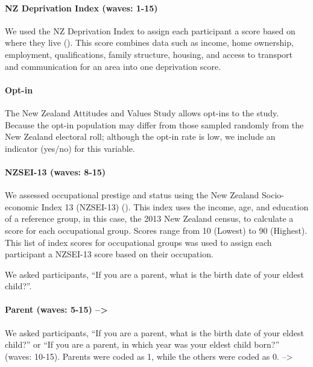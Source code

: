 \documentclass[
  singlecolumn]{article}
\let\oldparagraph\paragraph
\renewcommand{\paragraph}[1]{\oldparagraph{#1}\mbox{}}
\begin{document}
\paragraph{NZ Deprivation Index (waves:
1-15)}\label{nz-deprivation-index-waves-1-15}

We used the NZ Deprivation Index to assign each participant a score
based on where they live (). This score combines data such as income, home ownership,
employment, qualifications, family structure, housing, and access to
transport and communication for an area into one deprivation score.

\paragraph{Opt-in}\label{opt-in}

The New Zealand Attitudes and Values Study allows opt-ins to the study.
Because the opt-in population may differ from those sampled randomly
from the New Zealand electoral roll; although the opt-in rate is low, we
include an indicator (yes/no) for this variable.

\paragraph{NZSEI-13 (waves: 8-15)}\label{nzsei-13-waves-8-15}

We assessed occupational prestige and status using the New Zealand
Socio-economic Index 13 (NZSEI-13) (). This index uses the income, age, and education of
a reference group, in this case, the 2013 New Zealand census, to
calculate a score for each occupational group. Scores range from 10
(Lowest) to 90 (Highest). This list of index scores for occupational
groups was used to assign each participant a NZSEI-13 score based on
their occupation.

We asked participants, ``If you are a parent, what is the birth date of
your eldest child?''.

\paragraph{Parent (waves: 5-15)
--\textgreater{}}\label{parent-waves-5-15}

We asked participants, ``If you are a parent, what is the birth date of
your eldest child?'' or ``If you are a parent, in which year was your
eldest child born?'' (waves: 10-15). Parents were coded as 1, while the
others were coded as 0. --\textgreater{}
\end{document}
